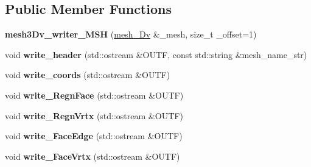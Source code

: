 \subsection*{Public Member Functions}
\begin{DoxyCompactItemize}
\item 
\mbox{\label{classStemMesh3D_1_1mesh3Dv__writer__MSH_addc534a27959ee5278aaa44dba796cb2}} 
{\bfseries mesh3\+Dv\+\_\+writer\+\_\+\+M\+SH} (\hyperlink{classStemMesh3D_1_1mesh__3Dv}{mesh\+\_\+Dv} \&\+\_\+mesh, size\+\_\+t \+\_\+offset=1)
\item 
\mbox{\label{classStemMesh3D_1_1mesh3Dv__writer__MSH_a1293667146a6678f0667720da49bae80}} 
void {\bfseries write\+\_\+header} (std\+::ostream \&O\+U\+TF, const std\+::string \&mesh\+\_\+name\+\_\+str)
\item 
\mbox{\label{classStemMesh3D_1_1mesh3Dv__writer__MSH_a2bd955e2ef48ba27f6b72558588a2746}} 
void {\bfseries write\+\_\+coords} (std\+::ostream \&O\+U\+TF)
\item 
\mbox{\label{classStemMesh3D_1_1mesh3Dv__writer__MSH_a60dfc86cab83e01b0f1e768d79433dad}} 
void {\bfseries write\+\_\+\+Regn\+Face} (std\+::ostream \&O\+U\+TF)
\item 
\mbox{\label{classStemMesh3D_1_1mesh3Dv__writer__MSH_a9a88a2cf4473c0903ade42135985272c}} 
void {\bfseries write\+\_\+\+Regn\+Vrtx} (std\+::ostream \&O\+U\+TF)
\item 
\mbox{\label{classStemMesh3D_1_1mesh3Dv__writer__MSH_a4c0bbe0405b2cf3a76fc2f2f68e7633d}} 
void {\bfseries write\+\_\+\+Face\+Edge} (std\+::ostream \&O\+U\+TF)
\item 
\mbox{\label{classStemMesh3D_1_1mesh3Dv__writer__MSH_a4caa9456d10177cbc59cbc5d6e442f50}} 
void {\bfseries write\+\_\+\+Face\+Vrtx} (std\+::ostream \&O\+U\+TF)
\item 
\mbox{\label{classStemMesh3D_1_1mesh3Dv__writer__MSH_a87b07b5d20ba5f2899d8b441f4509540}} 

\end{DoxyCompactItemize}
